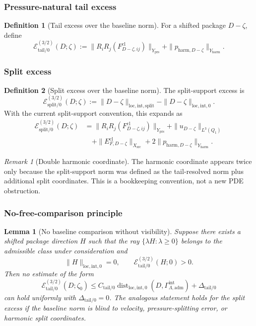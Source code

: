 \documentclass[11pt]{article}
\numberwithin{equation}{section}
\newtheorem{lemma}[lemma]{Lemma}
\theoremstyle{definition}
\newtheorem{definition}[definition]{Definition}
\theoremstyle{remark}
\newtheorem{remark}[remark]{Remark}
\newcommand{\loc}{\mathrm{loc}}
\newcommand{\intg}{\mathrm{int}}
\newcommand{\tail}{\mathrm{tail}}
\newcommand{\spl}{\mathrm{split}}
\newcommand{\adm}{\mathrm{adm}}
\newcommand{\prs}{\mathrm{prs}}
\newcommand{\harm}{\mathrm{harm}}
\newcommand{\src}{\mathrm{src}}
\newcommand{\cl}{\mathrm{cl}}
\newcommand{\Dist}{\operatorname{dist}}
\newcommand{\calE}{\mathcal E}
\newcommand{\Gammaadm}{\Gamma^{\intg}_{\Lambda,\adm}}
\begin{document}
\subsubsection{Pressure-natural tail excess}

\begin{definition}[Tail excess over the baseline norm]
For a shifted package \(D-\zeta\), define
\[
    \calE_{\tail/0}^{(3/2)}(D;\zeta)
    :=
    \|R_iR_j(F^{\cl}_{D-\zeta,ij})\|_{Y_{\prs}}
    +
    \|p_{\harm,D-\zeta}\|_{Y_{\harm}}.
\]
\end{definition}

\subsubsection{Split excess}

\begin{definition}[Split excess over the baseline norm]
The split-support excess is
\[
    \calE_{\spl/0}^{(3/2)}(D;\zeta)
    :=
    \|D-\zeta\|_{\loc,\intg,\spl}
    -
    \|D-\zeta\|_{\loc,\intg,0}.
\]
With the current split-support convention, this expands as
\[
\begin{aligned}
    \calE_{\spl/0}^{(3/2)}(D;\zeta)
    &=
    \|R_iR_j(F^{\cl}_{D-\zeta,ij})\|_{Y_{\prs}}
    +
    \|u_{D-\zeta}\|_{L^3(Q_1)}
\\
    &\quad
    +
    \|E^{\cl}_{F,D-\zeta}\|_{X_{\src}}
    +
    2\|p_{\harm,D-\zeta}\|_{Y_{\harm}}.
\end{aligned}
\]
\end{definition}

\begin{remark}[Double harmonic coordinate]
The harmonic coordinate appears twice only because the split-support norm was
defined as the tail-resolved norm plus additional split coordinates.  This is
a bookkeeping convention, not a new PDE obstruction.
\end{remark}

\subsubsection{No-free-comparison principle}
\label{sec:no-free-comparison}

\begin{lemma}[No baseline comparison without visibility]
\label{lem:no-free-comparison}
Suppose there exists a shifted package direction \(H\) such that the ray
\(\{\lambda H:\lambda\ge0\}\) belongs to the admissible class under
consideration and
\[
    \|H\|_{\loc,\intg,0}=0,
    \qquad
    \calE_{\tail/0}^{(3/2)}(H;0)>0.
\]
Then no estimate of the form
\[
    \calE_{\tail/0}^{(3/2)}(D;\zeta_0)
    \le
    C_{\tail/0}
    \Dist_{\loc,\intg,0}(D,\Gammaadm)
    +
    \Delta_{\tail/0}
\]
can hold uniformly with \(\Delta_{\tail/0}=0\).  The analogous statement holds
for the split excess if the baseline norm is blind to velocity,
pressure-splitting error, or harmonic split coordinates.
\end{lemma}
\end{document}
